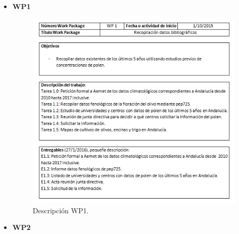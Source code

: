 \documentclass[12pt,oneside,a4paper]{article}
\numberwithin{figure}{section}
\begin{document}
\clearpage
\begin{itemize}
\item \textbf{WP1}

\begin{figure}[H]
\begin{center}
\includegraphics[scale=1]{WP1.png}
\caption{Descripción WP1.}
\label{fig:WP1}
\end{center}
\end{figure}
\clearpage

\item \textbf{WP2}


\end{itemize}
\end{document}
